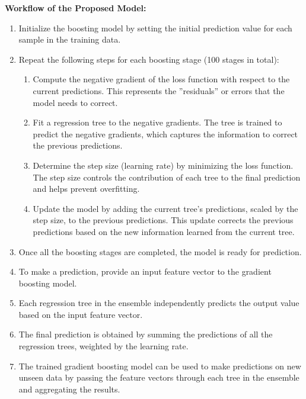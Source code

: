 \textbf{Workflow of the Proposed Model:}
\begin{enumerate}
    \item Initialize the boosting model by setting the initial prediction value for each sample in the training data.
    \item Repeat the following steps for each boosting stage (100 stages in total):
    \begin{enumerate}
        \item Compute the negative gradient of the loss function with respect to the current predictions. This represents the ”residuals” or errors that the model needs to correct.
        \item Fit a regression tree to the negative gradients. The tree is trained to predict the negative gradients, which captures the information to correct the previous predictions.
        \item Determine the step size (learning rate) by minimizing the loss function. The step size controls the contribution of each tree to the final prediction and helps prevent overfitting.
        \item Update the model by adding the current tree’s predictions, scaled by the step size, to the previous predictions. This update corrects the previous predictions based on the new information learned from the current tree.
    \end{enumerate}
    \item Once all the boosting stages are completed, the model is ready for prediction.
    \item To make a prediction, provide an input feature vector to the gradient boosting model.
    \item Each regression tree in the ensemble independently predicts the output value based on the input feature vector.
    \item The final prediction is obtained by summing the predictions of all the regression trees, weighted by the learning rate.
    \item The trained gradient boosting model can be used to make predictions on new unseen data by passing the feature vectors through each tree in the ensemble and aggregating the results.
\end{enumerate}

